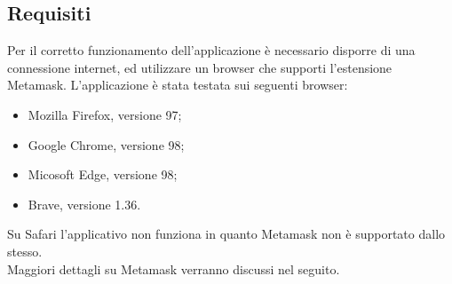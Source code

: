 \subsection{Requisiti}
Per il corretto funzionamento dell'applicazione è necessario disporre di una connessione internet, ed utilizzare un browser che supporti l'estensione Metamask.
L'applicazione è stata testata sui seguenti browser:
\begin{itemize}
    \item Mozilla Firefox, versione 97;
    \item Google Chrome, versione 98;
    \item Micosoft Edge, versione 98;
    \item Brave, versione 1.36.
\end{itemize}
Su Safari l'applicativo non funziona in quanto Metamask non è supportato dallo stesso.\\
Maggiori dettagli su Metamask verranno discussi nel seguito.



